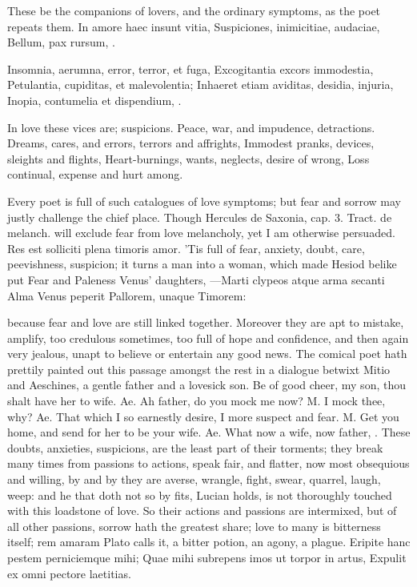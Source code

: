 These be the companions of lovers, and the ordinary symptoms, as the
poet repeats them.
In amore haec insunt vitia,
Suspiciones, inimicitiae, audaciae,
Bellum, pax rursum, \etc{}.

Insomnia, aerumna, error, terror, et fuga,
Excogitantia excors immodestia,
Petulantia, cupiditas, et malevolentia;
Inhaeret etiam aviditas, desidia, injuria,
Inopia, contumelia et dispendium, \etc{}.

In love these vices are; suspicions.
Peace, war, and impudence, detractions.
Dreams, cares, and errors, terrors and affrights,
Immodest pranks, devices, sleights and flights,
Heart-burnings, wants, neglects, desire of wrong,
Loss continual, expense and hurt among.

Every poet is full of such catalogues of love symptoms; but fear and
sorrow may justly challenge the chief place. Though Hercules de
Saxonia, cap. 3. Tract. de melanch. will exclude fear from love
melancholy, yet I am otherwise persuaded. Res est solliciti plena
timoris amor. 'Tis full of fear, anxiety, doubt, care, peevishness,
suspicion; it turns a man into a woman, which made Hesiod belike put
Fear and Paleness Venus' daughters,
---Marti clypeos atque arma secanti
Alma Venus peperit Pallorem, unaque Timorem:

because fear and love are still linked together. Moreover they are apt
to mistake, amplify, too credulous sometimes, too full of hope and
confidence, and then again very jealous, unapt to believe or entertain
any good news. The comical poet hath prettily painted out this passage
amongst the rest in a dialogue betwixt Mitio and Aeschines, a
gentle father and a lovesick son. Be of good cheer, my son, thou shalt
have her to wife. Ae. Ah father, do you mock me now? M. I mock thee,
why? Ae. That which I so earnestly desire, I more suspect and fear. M.
Get you home, and send for her to be your wife. Ae. What now a wife,
now father, \etc{}. These doubts, anxieties, suspicions, are the least part
of their torments; they break many times from passions to actions,
speak fair, and flatter, now most obsequious and willing, by and by
they are averse, wrangle, fight, swear, quarrel, laugh, weep: and he
that doth not so by fits, Lucian holds, is not thoroughly touched
with this loadstone of love. So their actions and passions are
intermixed, but of all other passions, sorrow hath the greatest share;
love to many is bitterness itself; rem amaram Plato calls it, a
bitter potion, an agony, a plague.
Eripite hanc pestem perniciemque mihi;
Quae mihi subrepens imos ut torpor in artus,
Expulit ex omni pectore laetitias.

